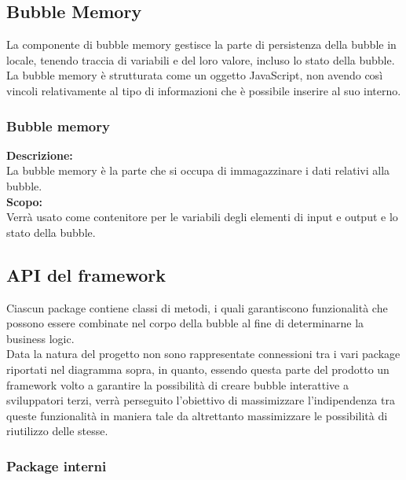 \subsection{Bubble Memory}
La componente di bubble memory gestisce la parte di persistenza della bubble in locale, tenendo traccia di variabili e del loro valore, incluso lo stato della bubble. La bubble memory è strutturata come un oggetto JavaScript, non avendo così vincoli relativamente al tipo di informazioni che è possibile inserire al suo interno.

\begin{samepage}
\subsubsection{Bubble memory}\label{fm-memory}
\end{samepage}
\textbf{Descrizione:}\\
La bubble memory è la parte che si occupa di immagazzinare i dati relativi alla bubble. \\
\textbf{Scopo:}\\
Verrà usato come contenitore per le variabili degli elementi di input e output e lo stato della bubble.

\subsection{API del framework}
Ciascun package contiene classi di metodi, i quali garantiscono funzionalità che possono essere combinate nel corpo della bubble al fine di determinarne la business logic.\\
Data la natura del progetto non sono rappresentate connessioni tra i vari package riportati nel diagramma sopra, in quanto, essendo questa parte del prodotto un framework volto a garantire la possibilità di creare bubble interattive a sviluppatori terzi, verrà perseguito l'obiettivo di massimizzare l'indipendenza tra queste funzionalità in maniera tale da altrettanto massimizzare le possibilità di riutilizzo delle stesse.

\subsubsection{Package interni}


